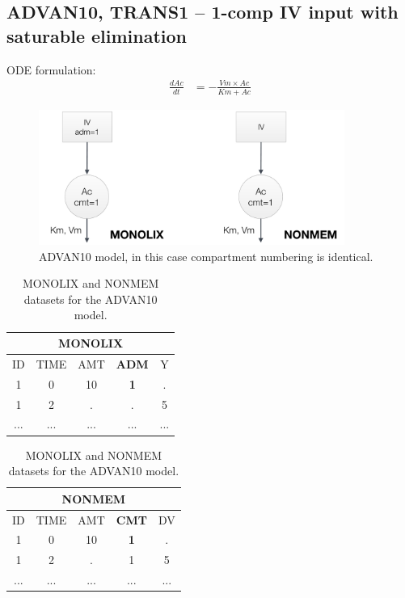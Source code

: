 \subsection{ADVAN10, TRANS1 -- 1-comp IV input with saturable elimination}
ODE formulation:
\begin{align}
\frac{dAc}{dt} &= - \frac{Vm \times Ac}{Km + Ac}  \nonumber
\end{align}

\begin{figure}[htbp!]
\centering
 \includegraphics[width=100mm]{pics/Advan10}
\caption{ADVAN10 model, in this case compartment numbering is identical.}
\label{fig:Advan10}
\end{figure}


\begin{table}[ht!]
\footnotesize
\parbox{.5\linewidth}{
\centering
\begin{tabular}{ccccc}
  \hline
   \multicolumn{5}{c}{\textbf{MONOLIX}} \\
  \hline
ID & TIME & AMT & \textbf{ADM} & Y \\
  \hline
1  & 0        & 10   & \textbf{1} & .       \\
1  & 2        & .      &	.	& 5        \\
... &  ...      &  ...   &  ... &  ...     \\
\end{tabular}
}
\hfill
\parbox{.5\linewidth}{
\centering
\begin{tabular}{ccccc}
  \hline
   \multicolumn{5}{c}{\textbf{NONMEM}} \\
  \hline
ID & TIME & AMT & \textbf{CMT} & DV \\
  \hline
1  & 0        & 10   & \textbf{1}   & .    \\
1  & 2        & .      & 1    & 5   \\
... &  ...      &  ...   &  ... & ...  \\
\end{tabular}
}
\caption{MONOLIX and NONMEM datasets for the ADVAN10 model.}
\end{table}


